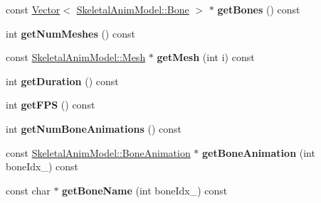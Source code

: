 \begin{DoxyCompactItemize}
\item 
const \hyperlink{class_magnum_1_1_vector}{Vector}$<$ \hyperlink{class_magnum_1_1_skeletal_anim_model_1_1_bone}{Skeletal\+Anim\+Model\+::\+Bone} $>$ $\ast$ {\bfseries get\+Bones} () const \hypertarget{class_magnum_1_1_skeletal_anim_model_1_1_data_a7478c8e692fbff3b59dc555eef34ee07}{}\label{class_magnum_1_1_skeletal_anim_model_1_1_data_a7478c8e692fbff3b59dc555eef34ee07}

\item 
int {\bfseries get\+Num\+Meshes} () const \hypertarget{class_magnum_1_1_skeletal_anim_model_1_1_data_ac44b74eb7b40109d04f6cd5a3d730b0a}{}\label{class_magnum_1_1_skeletal_anim_model_1_1_data_ac44b74eb7b40109d04f6cd5a3d730b0a}

\item 
const \hyperlink{class_magnum_1_1_skeletal_anim_model_1_1_mesh}{Skeletal\+Anim\+Model\+::\+Mesh} $\ast$ {\bfseries get\+Mesh} (int i) const \hypertarget{class_magnum_1_1_skeletal_anim_model_1_1_data_a0c8cb84802eb34a338d1809773617ca7}{}\label{class_magnum_1_1_skeletal_anim_model_1_1_data_a0c8cb84802eb34a338d1809773617ca7}

\item 
int {\bfseries get\+Duration} () const \hypertarget{class_magnum_1_1_skeletal_anim_model_1_1_data_a50405a27d392d884a94722a564265f60}{}\label{class_magnum_1_1_skeletal_anim_model_1_1_data_a50405a27d392d884a94722a564265f60}

\item 
int {\bfseries get\+F\+PS} () const \hypertarget{class_magnum_1_1_skeletal_anim_model_1_1_data_a007328bf61c05086c3438afdb2dab515}{}\label{class_magnum_1_1_skeletal_anim_model_1_1_data_a007328bf61c05086c3438afdb2dab515}

\item 
int {\bfseries get\+Num\+Bone\+Animations} () const \hypertarget{class_magnum_1_1_skeletal_anim_model_1_1_data_abdd4a553bc0bd80b6c676487a353631c}{}\label{class_magnum_1_1_skeletal_anim_model_1_1_data_abdd4a553bc0bd80b6c676487a353631c}

\item 
const \hyperlink{class_magnum_1_1_skeletal_anim_model_1_1_bone_animation}{Skeletal\+Anim\+Model\+::\+Bone\+Animation} $\ast$ {\bfseries get\+Bone\+Animation} (int bone\+Idx\+\_\+) const \hypertarget{class_magnum_1_1_skeletal_anim_model_1_1_data_a7910e5b7d066c1c2ae0ffa1f2685fb57}{}\label{class_magnum_1_1_skeletal_anim_model_1_1_data_a7910e5b7d066c1c2ae0ffa1f2685fb57}

\item 
const char $\ast$ {\bfseries get\+Bone\+Name} (int bone\+Idx\+\_\+) const \hypertarget{class_magnum_1_1_skeletal_anim_model_1_1_data_a75b9a1ea58d1138c66ce3564cf370935}{}\label{class_magnum_1_1_skeletal_anim_model_1_1_data_a75b9a1ea58d1138c66ce3564cf370935}


\end{DoxyCompactItemize}
